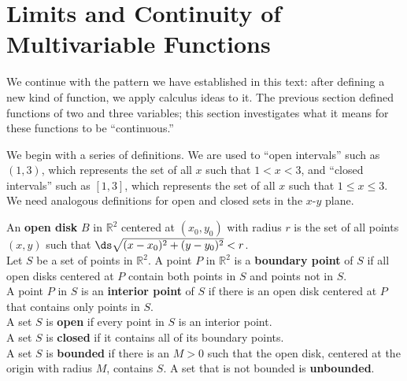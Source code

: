 \section{Limits and Continuity of Multivariable Functions}\label{sec:multi_limit}

We continue with the pattern we have established in this text: after defining a new kind of function, we apply calculus ideas to it. The previous section defined functions of two and three variables; this section investigates what it means for these functions to be ``continuous.''

We begin with a series of definitions. We are used to ``open intervals'' such as $(1,3)$, which represents the set of all $x$ such that $1<x<3$,  and ``closed intervals'' such as $[1,3]$, which represents the set of all $x$ such that $1\leq x\leq 3$. We need analogous definitions for open and closed sets in the $x$-$y$ plane.

{An \textbf{open disk} $B$ in $\mathbb{R}^2$ centered at $(x_0,y_0)$ with radius $r$ is the set of all points $(x,y)$ such that $\ds\sqrt{(x-x_0)^2+(y-y_0)^2} < r$. \\

Let $S$ be a set of points in $\mathbb{R}^2$. A point $P$ in $\mathbb{R}^2$ is a \textbf{boundary point} of $S$  if all open disks centered at $P$ contain both points in $S$ and points not in $S$.\\

A point $P$ in $S$ is an \textbf{interior point} of $S$ if there is an open disk centered at $P$ that contains only points in $S$. \\

A set $S$ is \textbf{open} if every point in $S$ is an interior point.\\

A set $S$ is \textbf{closed} if it contains all of its boundary points.\\

A set $S$ is \textbf{bounded} if there is an $M>0$ such that the open disk, centered at the origin with radius $M$, contains $S$. A set that is not bounded is \textbf{unbounded}.
}

